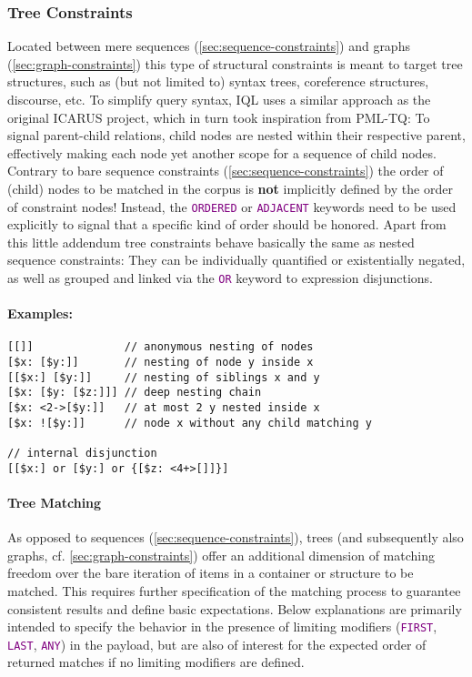 \documentclass[11pt,a4paper,portrait]{article}
\newcommand{\iql}{IQL\xspace}
\newcommand{\keyword}[1]{\textcolor{purple}{\texttt{#1}}}
\begin{document}
\subsubsection{Tree Constraints}
\label{sec:tree-constraints}

Located between mere sequences (\ref{sec:sequence-constraints}) and graphs (\ref{sec:graph-constraints}) this type of structural constraints is meant to target tree structures, such as (but not limited to) syntax trees, coreference structures, discourse, etc.
To simplify query syntax, \iql uses a similar approach as the original ICARUS project, which in turn took inspiration from PML-TQ:
To signal parent-child relations, child nodes are nested within their respective parent, effectively making each node yet another scope for a sequence of child nodes.
Contrary to bare sequence constraints (\ref{sec:sequence-constraints}) the order of (child) nodes to be matched in the corpus is \textbf{not} implicitly defined by the order of constraint nodes!
Instead, the \keyword{ORDERED} or \keyword{ADJACENT} keywords need to be used explicitly to signal that a specific kind of order should be honored.
Apart from this little addendum tree constraints behave basically the same as nested sequence constraints:
They can be individually quantified or existentially negated, as well as grouped and linked via the \keyword{OR} keyword to expression disjunctions.

\paragraph{Examples:}

\begin{verbatim}
[[]]              // anonymous nesting of nodes
[$x: [$y:]]       // nesting of node y inside x
[[$x:] [$y:]]     // nesting of siblings x and y
[$x: [$y: [$z:]]] // deep nesting chain 
[$x: <2->[$y:]]   // at most 2 y nested inside x
[$x: ![$y:]]      // node x without any child matching y

// internal disjunction
[[$x:] or [$y:] or {[$z: <4+>[]]}]
\end{verbatim}

\paragraph{Tree Matching}

\noindent As opposed to sequences (\ref{sec:sequence-constraints}), trees (and subsequently also graphs, cf. \ref{sec:graph-constraints}) offer an additional dimension of matching freedom over the bare iteration of items in a container or structure to be matched.
This requires further specification of the matching process to guarantee consistent results and define basic expectations.
Below explanations are primarily intended to specify the behavior in the presence of limiting modifiers (\keyword{FIRST}, \keyword{LAST}, \keyword{ANY}) in the payload, but are also of interest for the expected order of returned matches if no limiting modifiers are defined.
\end{document}
